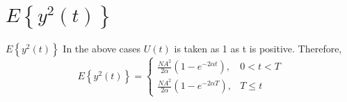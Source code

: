 \documentclass{beamer}
\providecommand{\cbrak}[1]{\ensuremath{\left\{#1\right\}}}
\begin{document}
\section{$E\cbrak{y^2(t)}$}
\begin{frame}{$E\cbrak{y^2(t)}$}
In the above cases $U(t)$ is taken as 1 as t is positive.
    Therefore,
    \begin{equation*}
           E\cbrak{y^2(t)} = \begin{cases}
                              \frac{NA^2}{2\alpha}(1-e^{-2\alpha t}),  & 0<t<T \\
                              \frac{NA^2}{2\alpha}(1-e^{-2\alpha T}),  & T\le t
                             \end{cases}
    \end{equation*}
\end{frame}
\end{document}
